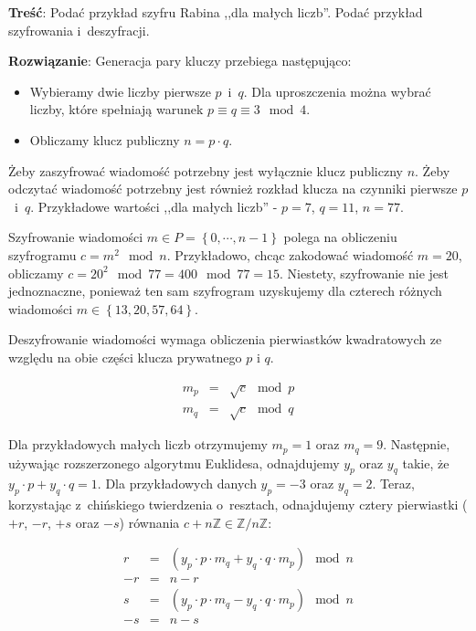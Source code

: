 \documentclass[a4paper,10pt, twocolumn]{article}
\begin{document}
\textbf{Treść}: Podać przykład szyfru Rabina ,,dla małych liczb''. Podać przykład szyfrowania i~deszyfracji.

\textbf{Rozwiązanie}: Generacja pary kluczy przebiega następująco:

\begin{itemize}
	\item Wybieramy dwie liczby pierwsze $p$~i~$q$. Dla uproszczenia można wybrać liczby, które spełniają warunek $p \equiv q \equiv 3 \mod 4$. 
	\item Obliczamy klucz publiczny $n = p \cdot q$.
\end{itemize}

\noindent Żeby zaszyfrować wiadomość potrzebny jest wyłącznie klucz publiczny $n$. Żeby odczytać wiadomość potrzebny jest również rozkład klucza na czynniki pierwsze $p$~i~$q$. Przykładowe wartości ,,dla małych liczb'' - $p = 7$, $q = 11$, $n = 77$.

\noindent Szyfrowanie wiadomości $m \in P = \left\{0, \cdots, n - 1 \right\}$ polega na obliczeniu szyfrogramu $c = m^{2} \mod n$. Przykładowo, chcąc zakodować wiadomość $m = 20$, obliczamy $c = 20^2 \mod 77 = 400 \mod 77 = 15$. Niestety, szyfrowanie nie jest jednoznaczne, ponieważ ten sam szyfrogram uzyskujemy dla czterech różnych wiadomości $m \in \left\{13, 20, 57, 64\right\}$.

\noindent Deszyfrowanie wiadomości wymaga obliczenia pierwiastków kwadratowych ze względu na obie części klucza prywatnego $p$ i $q$.

\begin{equation*}
	\begin{array}{lcl} m_{p} & = & \sqrt{c} \mod p \\ m_{q} & = & \sqrt{c} \mod q \end{array}
\end{equation*}

\noindent Dla przykładowych małych liczb otrzymujemy $m_{p} = 1$ oraz $m_{q} = 9$. Następnie, używając rozszerzonego algorytmu Euklidesa, odnajdujemy $y_{p}$ oraz $y_{q}$ takie, że $y_{p} \cdot p + y_{q} \cdot q = 1$. Dla przykładowych danych $y_{p} = -3$ oraz $y_{q} = 2$. Teraz, korzystając z~chińskiego twierdzenia o~resztach, odnajdujemy cztery pierwiastki ($+r$, $-r$, $+s$ oraz $-s$) równania $c + n\mathbb{Z} \in \mathbb{Z}/n\mathbb{Z}$:

\begin{equation*}
	\begin{array}{lcl} r & = & (y_{p} \cdot p \cdot m_{q} + y_{q} \cdot q \cdot m_{p}) \mod n \\ -r & = & n - r \\ s & = & (y_{p} \cdot p \cdot m_{q} - y_{q} \cdot q \cdot m_{p}) \mod n \\ -s & = & n - s \\ \end{array}
\end{equation*}
\end{document}
